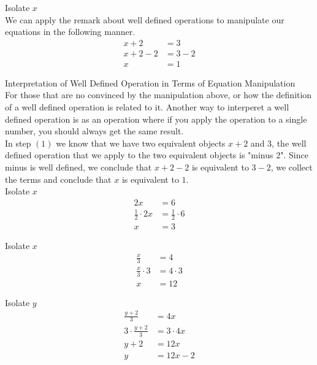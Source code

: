 \documentclass{book}
\begin{document}
  {\example Isolate $x$ \\
    \noindent We can apply the remark about well defined operations to manipulate our equations in the following manner.
    \begin{align}
      x + 2 & = 3\\
      x + 2 - 2 & = 3 - 2\\
      x & = 1
    \end{align}
  }

  {\remark Interpretation of Well Defined Operation in Terms of Equation Manipulation \\
    For those that are no convinced by the manipulation above, or how the definition of a well defined operation is related to it. Another way to interperet a well defined operation is as an operation where if you apply the operation to a single number, you should always get the same result.\\

    \noindent In step $(1)$ we know that we have two equivalent objects $x + 2$ and $3$, the well defined operation that we apply to the two equivalent objects is "minus 2". Since minus is well defined, we conclude that $x + 2 - 2$ is equivalent to $3 - 2$, we collect the terms and conclude that $x$ is equivalent to $1$.
  }\\

  {\example Isolate $x$ \\
    \begin{align*}
      2x & = 6\\
      \frac{1}{2} \cdot 2x & = \frac{1}{2} \cdot 6\\
      x & = 3
    \end{align*}
  }

  {\example Isolate $x$ \\
    \begin{align*}
      \frac{x}{3} & = 4\\
      \frac{x}{3} \cdot 3 & = 4 \cdot 3\\
      x & = 12
    \end{align*}
  }

  {\example Isolate $y$ \\
    \begin{align*}
      \frac{y + 2}{3} & = 4x\\
      3 \cdot \frac{y + 2}{3} & = 3 \cdot 4x\\
      y + 2 & = 12x\\
      y & = 12x - 2
    \end{align*}
  }
\end{document}
